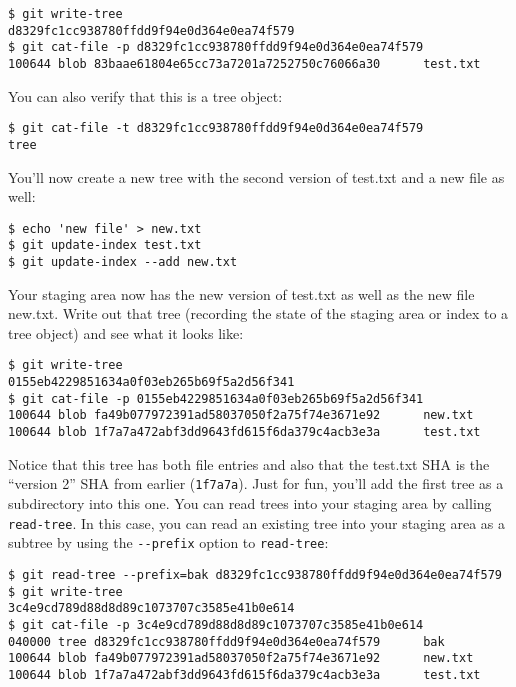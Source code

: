\documentclass[a4paper]{book}
\begin{document}
\begin{shaded}\begin{verbatim}
$ git write-tree
d8329fc1cc938780ffdd9f94e0d364e0ea74f579
$ git cat-file -p d8329fc1cc938780ffdd9f94e0d364e0ea74f579
100644 blob 83baae61804e65cc73a7201a7252750c76066a30      test.txt
\end{verbatim}\end{shaded}

You can also verify that this is a tree object:

\begin{shaded}\begin{verbatim}
$ git cat-file -t d8329fc1cc938780ffdd9f94e0d364e0ea74f579
tree
\end{verbatim}\end{shaded}

You'll now create a new tree with the second version of test.txt and a new file as well:

\begin{shaded}\begin{verbatim}
$ echo 'new file' > new.txt
$ git update-index test.txt
$ git update-index --add new.txt
\end{verbatim}\end{shaded}

Your staging area now has the new version of test.txt as well as the new file new.txt. Write out that tree (recording the state of the staging area or index to a tree object) and see what it looks like:

\begin{shaded}\begin{verbatim}
$ git write-tree
0155eb4229851634a0f03eb265b69f5a2d56f341
$ git cat-file -p 0155eb4229851634a0f03eb265b69f5a2d56f341
100644 blob fa49b077972391ad58037050f2a75f74e3671e92      new.txt
100644 blob 1f7a7a472abf3dd9643fd615f6da379c4acb3e3a      test.txt
\end{verbatim}\end{shaded}

Notice that this tree has both file entries and also that the test.txt SHA is the “version 2” SHA from earlier (\texttt{1f7a7a}). Just for fun, you'll add the first tree as a subdirectory into this one. You can read trees into your staging area by calling \texttt{read-tree}. In this case, you can read an existing tree into your staging area as a subtree by using the \texttt{-{}-prefix} option to \texttt{read-tree}:

\begin{shaded}\begin{verbatim}
$ git read-tree --prefix=bak d8329fc1cc938780ffdd9f94e0d364e0ea74f579
$ git write-tree
3c4e9cd789d88d8d89c1073707c3585e41b0e614
$ git cat-file -p 3c4e9cd789d88d8d89c1073707c3585e41b0e614
040000 tree d8329fc1cc938780ffdd9f94e0d364e0ea74f579      bak
100644 blob fa49b077972391ad58037050f2a75f74e3671e92      new.txt
100644 blob 1f7a7a472abf3dd9643fd615f6da379c4acb3e3a      test.txt
\end{verbatim}\end{shaded}
\end{document}
